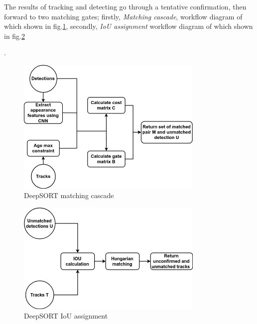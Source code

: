 The results of tracking and detecting go through a tentative confirmation, then forward to two matching gates; 
firstly, \textit{Matching cascade}, workflow diagram of which shown in fig.\ref{fig:org_matching_cascade},
 secondly, \textit{\acrshort{IoU} assignment} workflow diagram of which shown in fig.\ref{fig:org_iou}\par.
\begin{figure}[h!]
    \centering
    \includegraphics[width=0.8\textwidth]{Chapters/Fig/Thesis_diagram-CNN_Matching_Cascade.png}
    \caption{DeepSORT matching cascade}
    \label{fig:org_matching_cascade}
\end{figure}
\begin{figure}[h!]
    \centering
    \includegraphics[width=0.8\textwidth]{Chapters/Fig/Thesis_diagram-IOU.png}
    \caption{DeepSORT \acrshort{IoU} assignment}
    \label{fig:org_iou}
\end{figure}

